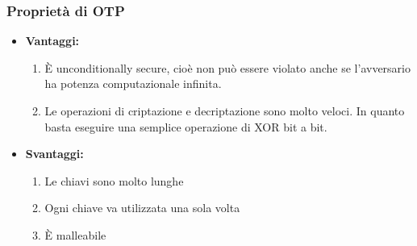 \documentclass[a4paper,12pt]{article}
\begin{document}
\subsubsection{Proprietà di OTP}
\begin{itemize}
	\item \textbf{Vantaggi:}
	\begin{enumerate}
		\item È unconditionally secure, cioè non può essere violato anche se l'avversario ha potenza computazionale infinita.
		\item Le operazioni di criptazione e decriptazione sono molto veloci. In quanto basta eseguire una semplice operazione di XOR bit a bit.
	\end{enumerate}
	\item \textbf{Svantaggi:}
	\begin{enumerate}
		\item Le chiavi sono molto lunghe
		\item Ogni chiave va utilizzata una sola volta
		\item È malleabile
	\end{enumerate}
\end{itemize}
\end{document}
